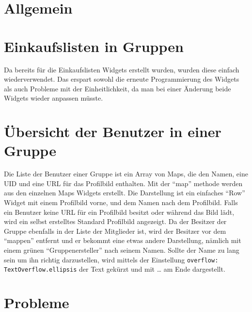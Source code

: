 \hypertarget{allgemein}{%
\section{Allgemein}\label{allgemein}}

\hypertarget{einkaufslisten-in-gruppen}{%
\section{Einkaufslisten in Gruppen}\label{einkaufslisten-in-gruppen}}

Da bereits für die Einkaufslisten Widgets erstellt wurden, wurden diese
einfach wiederverwendet. Das erspart sowohl die erneute Programmierung
des Widgets als auch Probleme mit der Einheitlichkeit, da man bei einer
Änderung beide Widgets wieder anpassen müsste.

\hypertarget{uxfcbersicht-der-benutzer-in-einer-gruppe}{%
\section{Übersicht der Benutzer in einer
Gruppe}\label{uxfcbersicht-der-benutzer-in-einer-gruppe}}

Die Liste der Benutzer einer Gruppe ist ein Array von Maps, die den
Namen, eine UID und eine URL für das Profilbild enthalten. Mit der
``map'' methode werden aus den einzelnen Maps Widgets erstellt. Die
Darstellung ist ein einfaches ``Row'' Widget mit einem Profilbild vorne,
und dem Namen nach dem Profilbild. Falls ein Benutzer keine URL für ein
Profilbild besitzt oder während das Bild lädt, wird ein selbst
erstelltes Standard Profilbild angezeigt. Da der Besitzer der Gruppe
ebenfalls in der Liste der Mitglieder ist, wird der Besitzer vor dem
``mappen'' entfernt und er bekommt eine etwas andere Darstellung,
nämlich mit einem grünen ``Gruppenersteller'' nach seinem Namen. Sollte
der Name zu lang sein um ihn richtig darzustellen, wird mittels der
Einstellung \passthrough{\lstinline!overflow: TextOverflow.ellipsis!}
der Text gekürzt und mit \ldots{} am Ende dargestellt.

\hypertarget{probleme}{%
\section{Probleme}\label{probleme}}
